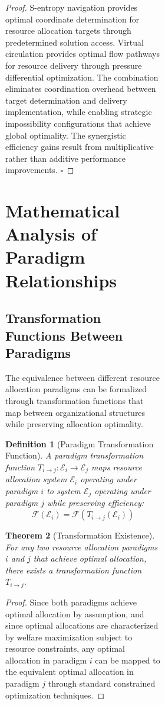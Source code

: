 \documentclass[12pt,a4paper]{article}
\newtheorem{theorem}{Theorem}
\newtheorem{definition}[theorem]{Definition}
\begin{document}
\begin{figure}[H]
\begin{figure}[H]
\begin{figure}[H]
\begin{proof}
S-entropy navigation provides optimal coordinate determination for resource allocation targets through predetermined solution access. Virtual circulation provides optimal flow pathways for resource delivery through pressure differential optimization. The combination eliminates coordination overhead between target determination and delivery implementation, while enabling strategic impossibility configurations that achieve global optimality. The synergistic efficiency gains result from multiplicative rather than additive performance improvements. $\square$
\end{proof}

\section{Mathematical Analysis of Paradigm Relationships}

\subsection{Transformation Functions Between Paradigms}

The equivalence between different resource allocation paradigms can be formalized through transformation functions that map between organizational structures while preserving allocation optimality.

\begin{definition}[Paradigm Transformation Function]
A paradigm transformation function $T_{i \to j} : \mathcal{E}_i \to \mathcal{E}_j$ maps resource allocation system $\mathcal{E}_i$ operating under paradigm $i$ to system $\mathcal{E}_j$ operating under paradigm $j$ while preserving efficiency:
\begin{equation}
\mathcal{F}(\mathcal{E}_i) = \mathcal{F}(T_{i \to j}(\mathcal{E}_i))
\end{equation}
\end{definition}

\begin{theorem}[Transformation Existence]
For any two resource allocation paradigms $i$ and $j$ that achieve optimal allocation, there exists a transformation function $T_{i \to j}$.
\end{theorem}

\begin{proof}
Since both paradigms achieve optimal allocation by assumption, and since optimal allocations are characterized by welfare maximization subject to resource constraints, any optimal allocation in paradigm $i$ can be mapped to the equivalent optimal allocation in paradigm $j$ through standard constrained optimization techniques.


\end{proof}
\end{figure}
\end{figure}
\end{figure}
\end{document}
